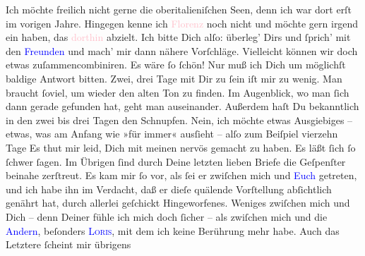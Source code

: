                Ich möchte freilich nicht gerne die oberitalieniſchen Seen, denn ich war dort erſt im
                  vorigen Jahre. Hingegen kenne ich \textcolor{pink}{Florenz}{}\ledrightnote{\textcolor{pink}{Florenz}} noch nicht und möchte gern irgend ein \label{K_L02627-2v}\label{K_L02627-2h} haben, das
                  \textcolor{pink}{dorthin}{} abzielt. Ich bitte
               Dich alſo: überleg’ Dirs und ſprich’ mit den \textcolor{blue}{Freunden}{} und mach’ mir dann nähere
               Vorſchläge. Vielleicht können wir {\pb}doch etwas
               zuſammencombiniren. Es wäre ſo ſchön! Nur muß ich Dich um möglichſt baldige Antwort
               bitten. Zwei, drei Tage mit Dir zu ſein iſt mir zu wenig. Man braucht ſoviel, um
               wieder den alten Ton zu finden. Im Augenblick, wo man ſich  dann gerade gefunden hat, geht man auseinander. Außerdem haſt Du
               bekanntlich in den zwei bis drei Tagen den Schnupfen. Nein, ich möchte etwas
               Ausgiebiges – etwas, was am Anfang wie »für immer« ausſieht – alſo zum Beiſpiel
               vierzehn Tage{\dotsfive}\pend
           \pstart
           Es thut mir leid, Dich {\pb}mit meinen \label{K_L02627-3v}\label{K_L02627-3h} nervös gemacht zu haben. Es läßt ſich ſo ſchwer ſagen. Im Übrigen ſind durch
               Deine letzten lieben Briefe die Geſpenſter beinahe zerſtreut. Es kam mir ſo vor, als
               ſei er zwiſchen mich und \textcolor{blue}{Euch}{} getreten, und ich habe ihn im
               Verdacht, daß er dieſe quälende Vorſtellung abſichtlich genährt hat, durch  allerlei geſchickt Hingeworfenes. Weniges zwiſchen
               mich und Dich – denn Deiner fühle {\pb}ich mich doch
               ſicher – als zwiſchen mich und die \textcolor{blue}{Andern}{}, beſonders \textsc{\textcolor{blue}{Loris}{}\ledrightnote{\textcolor{blue}{Hugo von Hofmannsthal}}}, mit dem ich keine Berührung mehr habe. Auch das Letztere ſcheint mir übrigens

